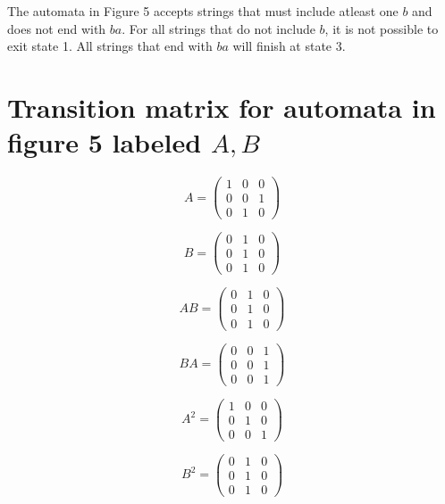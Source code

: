 \documentclass[12pt]{scrreprt}
\begin{document}
The automata in Figure 5 accepts strings that must include atleast one $b$ and does not end with $ba$.
For all strings that do not include $b$, it is not possible to exit state 1.
All strings that end with $ba$ will finish at state 3.

\section{Transition matrix for automata in figure 5 labeled $A,B$}

\[ A = \left( \begin{array}{ccc}
1 & 0 & 0 \\
0 & 0 & 1 \\
0 & 1 & 0 \end{array} \right)\] 

\[ B = \left( \begin{array}{ccc}
0 & 1 & 0 \\
0 & 1 & 0 \\
0 & 1 & 0 \end{array} \right)\] 

\[ AB = \left( \begin{array}{ccc}
0 & 1 & 0 \\
0 & 1 & 0 \\
0 & 1 & 0 \end{array} \right)\] 

\[ BA = \left( \begin{array}{ccc}
0 & 0 & 1 \\
0 & 0 & 1 \\
0 & 0 & 1 \end{array} \right)\] 

\[ A^2 = \left( \begin{array}{cccc}
1 & 0 & 0 \\
0 & 1 & 0 \\
0 & 0 & 1 \end{array} \right)\] 

\[ B^2 = \left( \begin{array}{cccc}
0 & 1 & 0 \\
0 & 1 & 0 \\
0 & 1 & 0 \end{array} \right)\] 
\end{document}
